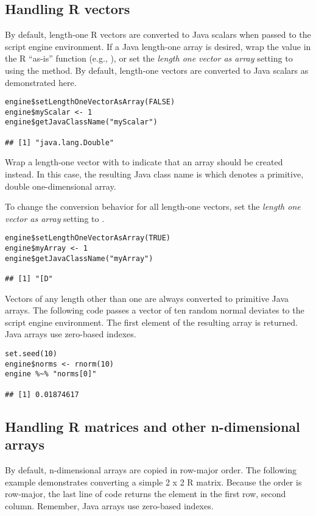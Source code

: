 \hypertarget{handlingrvectors}{\subsection{Handling R vectors}}

By default, length-one R vectors are converted to Java scalars when passed to the script engine environment. If a Java length-one array is desired, wrap the value in the R ``as-is'' function (e.g., ), or set the \textit{length one vector as array} setting to  using the  method. By default, length-one vectors are converted to Java scalars as demonstrated here.

\begin{verbatim}
engine$setLengthOneVectorAsArray(FALSE)
engine$myScalar <- 1
engine$getJavaClassName("myScalar")

## [1] "java.lang.Double"
\end{verbatim}
Wrap a length-one vector with  to indicate that an array should be created instead. In this case, the resulting Java class name is \code{"[D"} which denotes a primitive, double one-dimensional array.

To change the conversion behavior for all length-one vectors, set the \textit{length one vector as array} setting to .
\begin{verbatim}
engine$setLengthOneVectorAsArray(TRUE)
engine$myArray <- 1
engine$getJavaClassName("myArray")

## [1] "[D"
\end{verbatim}

Vectors of any length other than one are always converted to primitive Java arrays. The following code passes a vector of ten random normal deviates to the script engine environment. The first element of the resulting array is returned.  Java arrays use zero-based indexes.

\begin{verbatim}
set.seed(10)
engine$norms <- rnorm(10)
engine %~% "norms[0]"

## [1] 0.01874617
\end{verbatim}

\subsection{Handling R matrices and other n-dimensional arrays}

By default, n-dimensional arrays are copied in row-major order. The following example demonstrates converting a simple 2 x 2 R matrix. Because the order is row-major, the last line of code returns the element in the first row, second column. Remember, Java arrays use zero-based indexes.

